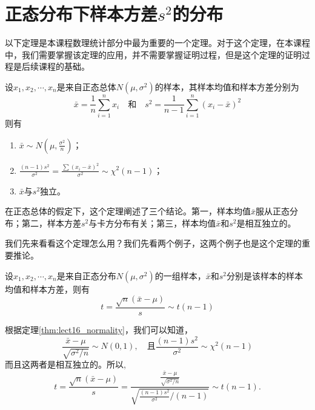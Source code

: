 \section{正态分布下样本方差$s^{2}$的分布}
以下定理是本课程数理统计部分中最为重要的一个定理。对于这个定理，在本课程中，我们需要掌握该定理的应用，并不需要掌握证明过程，但是这个定理的证明过程是后续课程的基础。
\begin{theorem}\label{thm:lect16_normality}
	设$x_{1},x_{2},\cdots,x_{n}$是来自正态总体$N(\mu,\sigma ^{2})$的样本，其样本均值和样本方差分别为
 $$
 \bar{x} = \frac{1}{n} \sum_{i=1}^n x_i  \quad\text{和}\quad s^2 = \frac{1}{n-1}\sum_{i=1}^n(x_i- \bar{x})^2
 $$
	则有
 \begin{enumerate}
\item $\bar{x} \sim N\left(\mu, \frac{\sigma^{2}}{n}\right) $；
\item $\frac{(n-1) s^{2}}{\sigma^{2}}=\frac{\sum\left(x_{i}-\bar{x}\right)^{2}}{\sigma^{2}} \sim \chi^{2}(n-1)$；
\item $\bar{x} $与$s^{2}$独立。
\end{enumerate}
\end{theorem}
\begin{remark}
    在正态总体的假定下，这个定理阐述了三个结论。第一，样本均值$\bar{x}$服从正态分布；第二，样本方差$s^2$与卡方分布有关；第三，样本均值$\bar{x}$和$s^2$是相互独立的。
\end{remark}
我们先来看看这个定理怎么用？我们先看两个例子，这两个例子也是这个定理的重要推论。
\begin{example}
    设$x_1,x_2,\cdots,x_n$是来自正态分布$N(\mu,\sigma^2)$的一组样本，$\bar{x}$和$s^2$分别是该样本的样本均值和样本方差，则有
$$
t = \frac{\sqrt{n}(\bar{x}-\mu)}{s} \sim t(n-1)
$$
\end{example}
\begin{solution}
    根据定理\ref{thm:lect16_normality}，我们可以知道，
    $$
    \frac{\bar{x}-\mu}{\sqrt{\sigma^2/n}}\sim N(0,1),\quad \text{且} \frac{(n-1)s^2}{\sigma^2} \sim \chi^2(n-1)
    $$
    而且这两者是相互独立的。所以,
    $$
    t = \frac{\sqrt{n}(\bar{x}-\mu)}{s} = \frac{\frac{\bar{x}-\mu}{\sqrt{\sigma^2/n}}}{\sqrt{\frac{(n-1)s^2}{\sigma^2}/(n-1)}} \sim t(n-1).
     $$
\end{solution}


